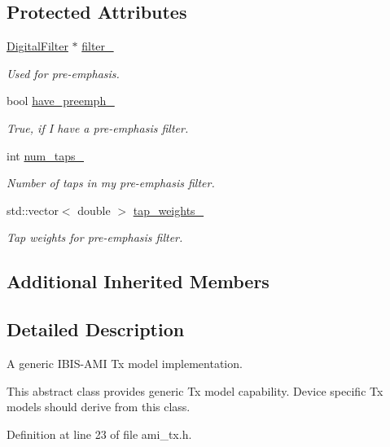 \subsection*{Protected Attributes}
\begin{DoxyCompactItemize}
\item 
\hyperlink{class_digital_filter}{Digital\+Filter} $\ast$ \hyperlink{class_ami_tx_a1eb407f2a0aa1010c5d381c172f8425d}{filter\+\_\+}
\begin{DoxyCompactList}\small\item\em Used for pre-\/emphasis. \end{DoxyCompactList}\item 
bool \hyperlink{class_ami_tx_a8e07817524a3626aaa432bcbe7cad30f}{have\+\_\+preemph\+\_\+}
\begin{DoxyCompactList}\small\item\em True, if I have a pre-\/emphasis filter. \end{DoxyCompactList}\item 
int \hyperlink{class_ami_tx_a166891685483a94632bbcd4e2afebf88}{num\+\_\+taps\+\_\+}
\begin{DoxyCompactList}\small\item\em Number of taps in my pre-\/emphasis filter. \end{DoxyCompactList}\item 
std\+::vector$<$ double $>$ \hyperlink{class_ami_tx_ab4878fcf087a793ca120ab1e30cabed5}{tap\+\_\+weights\+\_\+}
\begin{DoxyCompactList}\small\item\em Tap weights for pre-\/emphasis filter. \end{DoxyCompactList}\end{DoxyCompactItemize}
\subsection*{Additional Inherited Members}


\subsection{Detailed Description}
A generic I\+B\+I\+S-\/\+A\+M\+I Tx model implementation. 

This abstract class provides generic Tx model capability. Device specific Tx models should derive from this class. 

Definition at line 23 of file ami\+\_\+tx.\+h.



